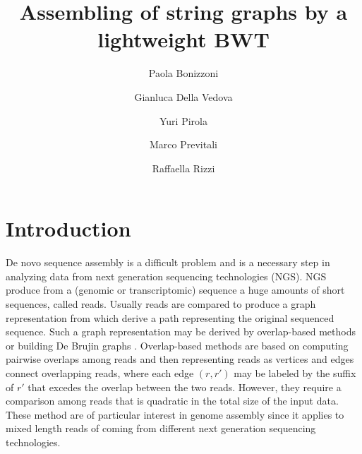 \documentclass[runningheads,envcountsame,a4paper]{llncs}
\newcommand{\etal}{\textit{et al.}\xspace}
\begin{document}
\title{Assembling of  string graphs by a lightweight BWT}

\author{%
  Paola Bonizzoni \and
  Gianluca Della Vedova \and
  Yuri Pirola \and
  Marco Previtali \and
  Raffaella Rizzi
}
\authorrunning{Bonizzoni \etal}


\maketitle

\begin{abstract}


\end{abstract}

\section{Introduction}
De novo sequence  assembly is a difficult problem  and is a necessary step  in analyzing data from next generation sequencing technologies (NGS).
NGS  produce from a  (genomic  or transcriptomic)  sequence a    huge amounts of short sequences, called reads. Usually reads are  compared to produce a  graph representation from which derive a path  representing the original sequenced sequence. Such a graph representation may be derived by overlap-based methods or building  De Brujin graphs \cite{}.
Overlap-based methods are based on computing pairwise overlaps among reads  and then representing reads as vertices and edges connect overlapping reads, where each edge $(r,r')$ may be labeled by the  suffix of $r'$ that  excedes the overlap between the two reads.  However, they require a comparison among reads that is quadratic in the total size of the input data.  These method are of particular interest in genome assembly since it applies to mixed length reads of  coming from different  next generation sequencing technologies.
\end{document}
